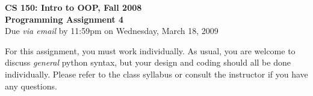 \documentclass[11pt]{article}
\begin{document}

\begin{center}
\LARGE \textbf{CS 150: Intro to OOP, Fall 2008}
\\
\textbf{Programming Assignment 4}
\\[1ex]
\Large Due \emph{via email} by 11:59pm on Wednesday, March 18, 2009\\

\end{center}

For this assignment, you must work individually.  As usual, you are
welcome to discuss {\em general} python syntax, but your design and
coding should all be done individually.  Please refer to the class
syllabus or consult the instructor if you have any questions.
\end{document}
